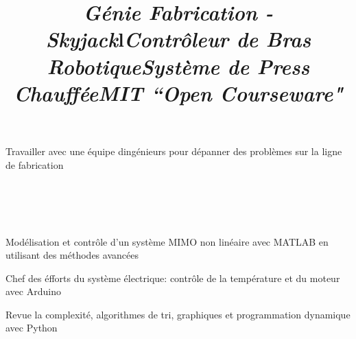 \documentclass[mm]{res}
\begin{document}
\begin{resume}
\title{\textsl{G\'enie Fabrication - Skyjack}}
\begin{position}
\tb Travailler avec une \'equipe d\textquotesingle ing\'enieurs pour d\'epanner des probl\`emes sur la ligne de fabrication
\end{position}


\toprule

\section{\headingprojects}
\begin{format}
\title{l}\\
\body\\
\end{format}


\title{\textsl{Contr\^oleur de Bras Robotique}}
\begin{position}
\tb Mod\'elisation et contr\^ole d'un syst\`eme MIMO non lin\'eaire avec MATLAB en utilisant des m\'ethodes avanc\'ees
\end{position}

\title{\textsl{Syst\`eme de Press Chauff\'ee}}
\begin{position}
\tb Chef des \'efforts du syst\`eme \'electrique: contr\^ole de la temp\'erature et du moteur avec Arduino
\end{position}

\title{\textsl{MIT ``Open Courseware"}}
\begin{position}
\tb Revue la complexit\'e, algorithmes de tri, graphiques et programmation dynamique avec Python
\end{position}


\end{resume}
\end{document}
